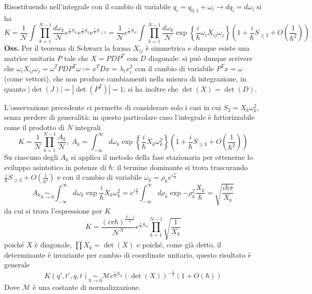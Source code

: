 Risostituendo nell'integrale con il cambio di variabile
$q_i=q_{0,1}+\omega_i\rightarrow dq_i=d\omega_i$ si ha 
$$K = \frac{1}{\mathcal{N}}\int \prod_{k=1}^{N-1}\frac{d\omega_k}{\mathcal{N}}
e^{\frac{i}{\hbar}S_{cl}} e^{\frac{i}{\hbar}S_2}e^{\frac{i}{\hbar}S_{\geq3}}=
\frac{1}{\mathcal{N}}e^{\frac{i}{\hbar}S_{cl}}\int \prod_{k=1}^{N-1}\frac{d\omega_k}{\mathcal{N}}
\exp\left\{\frac{i}{\hbar}\omega_iX_{ij}\omega_j\right\}\left(1+\frac{i}{\hbar}S_{\geq3}+
O\left(\frac{1}{\hbar^2}\right)\right)$$
\textbf{Oss.} Per il teorema di Schwarz la forma $X_{ij}$ è simmetrica e dunque esiste una matrice
unitaria $P$ tale che $X = PDP^{T}$ con $D$ diagonale: si può dunque scrivere che 
$\omega_iX_{ij}\omega_j = \omega^{T}PDP^T\omega := x^TDx = \lambda_ix_i^2$ con il cambio di variabile
$P^Tx = \omega$ (come vettori), che non produce cambiamenti nella misura di integrazione, in
quanto $\left|\det(J)\right| = \left|\det(P^{T})\right| = 1$; si ha inoltre che $\det(X) = \det(D)$.

L'osservazione precedente ci permette di considerare solo i casi in cui $S_2 = X_k\omega_k^2$, senza
perdere di generalità: in questo particolare caso l'integrale è fattorizzabile come il prodotto di
$N$ integrali
$$K = \frac{1}{\mathcal{N}}\prod_{k=1}^{N-1}\frac{A_k}{\mathcal{N}},\; A_k =
\int_{-\infty}^{\infty}d\omega_k\exp\left\{\frac{i}{\hbar}X_k\omega^2_k\right\}\left(
1+\frac{i}{\hbar}S_{\geq3}+O\left(\frac{1}{\hbar^2}\right)\right)$$
Su ciascuno degli $A_k$ si applica il metodo della fase stazionaria per ottenerne lo sviluppo
asintotico in potenze di $\hbar$: il termine dominante si trova trascurando
$\frac{i}{\hbar}S_{\geq3}+O\left(\frac{1}{\hbar^2}\right)$ e con il cambio di variabile
$\omega_k = \rho_ke^{i\frac{\pi}{4}}$
$$A_k \underset{\hbar\to0}\sim \int_{-\infty}^{\infty}d\omega_k \exp{\frac{i}{\hbar}X_k\omega_k^2} = 
e^{i\frac{\pi}{4}}\int_{-\infty}^{\infty}d\rho_k \exp{-\rho^2_k\frac{X_k}{\hbar}} =
\sqrt{\frac{i\hbar\pi}{X_k}}$$
da cui si trova l'espressione per $K$
$$K = \frac{\left(i\pi\hbar\right)^{\frac{N-1}{2}}}{\mathcal{N}^N}e^{\frac{i}{\hbar}S_{cl}}
\prod_{k=1}^{N-1}\sqrt{\frac{1}{X_k}}$$
poiché $X$ è diagonale, $\prod X_k = \det(X)$ e poiché, come già detto, il determinante è invariante
per cambio di coordinate unitario, questo risultato è generale
\begin{equation}
    \boxed{K(q',t',q,t) \underset{\hbar\to0}\sim \mathcal{M}e^{\frac{i}{\hbar}S_{cl}}\left(\det(X)
    \right)^{-\frac{1}{2}}\left(1+O(\hbar)\right)}
    \label{eq:K_det}
\end{equation}
Dove $\mathcal{M}$ è una costante di normalizzazione.

